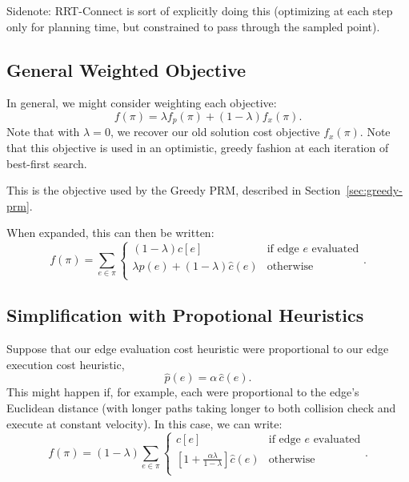 \documentclass{report}
\begin{document}
Sidenote: RRT-Connect is sort of explicitly doing this
(optimizing at each step only for planning time,
but constrained to pass through the sampled point).

\subsection{General Weighted Objective}

In general, we might consider weighting each objective:
\begin{equation}
   f(\pi) = \lambda f_p(\pi) + (1 - \lambda) f_x(\pi) .
   \label{eqn:general-objective}
\end{equation}
Note that with $\lambda=0$,
we recover our old solution cost objective $f_x(\pi)$.
Note that this objective is used in an optimistic, greedy fashion at each
iteration of best-first search.

This is the objective used by the Greedy PRM,
described in Section~\ref{sec:greedy-prm}.

When expanded,
this can then be written:
\begin{equation}
   f(\pi) = \sum_{e \in \pi} \left\{
   \begin{array}{cl}
      (1 - \lambda) c[e] & \mbox{if edge } e \mbox{ evaluated}  \\
      \lambda \hat{p}(e) + (1 - \lambda) \hat{c}(e) & \mbox{otherwise} \\
   \end{array}
   \right.
   .
   \label{eqn:general-objective-explicit}
\end{equation}

\subsection{Simplification with Propotional Heuristics}

Suppose that our edge evaluation cost heuristic
were proportional to our edge execution cost heuristic,
\begin{equation}
   \hat{p}(e) = \alpha \, \hat{c}(e) .
\end{equation}
This might happen if, for example, each were proportional to the edge's
Euclidean distance (with longer paths taking longer to both collision check
and execute at constant velocity).
In this case, we can write:
\begin{equation}
   f(\pi) = (1-\lambda) \sum_{e \in \pi} \left\{
   \begin{array}{cl}
      c[e] & \mbox{if edge } e \mbox{ evaluated}  \\
      \left[ 1 + \frac{\alpha\lambda}{1 - \lambda} \right] \hat{c}(e) & \mbox{otherwise} \\
   \end{array}
   \right.
   .
   \label{eqn:prop-heuristics}
\end{equation}
\end{document}
